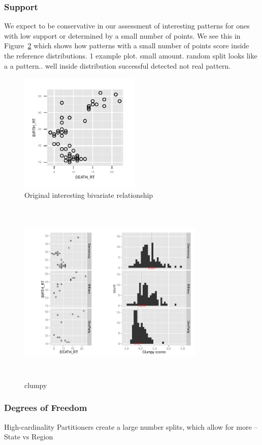 \subsubsection{Support}
We expect to be conservative in our assessment of interesting patterns for ones with low support or determined by a small number of points. We see this in Figure~\ref{fig:clumpy1} which shows how patterns with a small number of points score inside the reference distributions.
 1 example plot. small amount. random split looks like a a pattern.. well inside distribution successful detected not real pattern.
\begin{figure}
 \centering 
\includegraphics[width=2.25in,height=2.25in]{images/BIRTH_RT-DEATH_RT.pdf}
  \caption{Original interesting bivariate relationship}
 \label{fig:original2}
\end{figure}

\begin{figure}
\raggedleft
\includegraphics[width=3.5in,height=3.5in]{images/2_05954102971921-GOV.pdf}
  \caption{clumpy}
 \label{fig:clumpy1}
\end{figure}

\subsubsection{Degrees of Freedom}
High-cardinality Partitioners create a large number splits, which allow for more
 -- State vs Region

